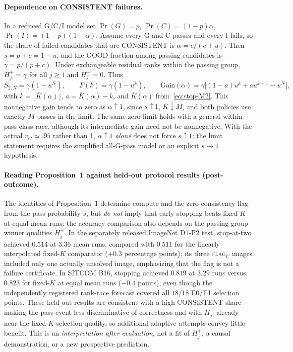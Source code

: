 \paragraph{Dependence on CONSISTENT failures.}
In a reduced G/C/I model set
$\Pr(G)=p$, $\Pr(C)=(1-p)\alpha$,
$\Pr(I)=(1-p)(1-\alpha)$. Assume every G and C passes and every I
fails, so the share of failed candidates that are CONSISTENT is
$\alpha=c/(c+u)$. Then
$s=p+c=1-u$, and the GOOD fraction among passing candidates is
$\gamma=p/(p+c)$. Under exchangeable residual ranks within the
passing group, $H_j^+=\gamma$ for all $j\ge1$ and $H_j^-=0$.
Thus
\begin{equation}\label{eq:protocol-consistent-share}
 S_{2,N}=\gamma(1-u^N),\qquad
 F(k)=\gamma(1-u^k),\qquad
 \mathrm{Gain}(\alpha)=\gamma\bigl[(1-a)u^k+a u^{k+1}-u^N\bigr],
\end{equation}
with $k=\lfloor\bar K(\alpha)\rfloor$, $a=\bar K(\alpha)-k$,
and $\bar K(\alpha)$ from~\eqref{eq:stop-M2}.
This nonnegative gain tends to zero as $\alpha\uparrow1$, since
$s\uparrow1$, $\bar K\downarrow M$, and both policies use exactly
$M$ passes in the limit. The same zero-limit holds with a general
within-pass class race, although its intermediate gain need not be
nonnegative. With the actual $v_G\simeq.95$ rather than 1,
$\alpha\uparrow1$ \emph{alone} does not force $s\uparrow1$;
the limit statement requires the simplified all-G-pass model or an
explicit $s\to1$ hypothesis.

\paragraph{Reading Proposition~1 against held-out protocol results (post-outcome).}
The identities of Proposition~1 determine compute and the
zero-consistency flag from the pass probability $s$, but \emph{do
not} imply that early stopping beats fixed-$K$ at equal mean runs:
the accuracy comparison also depends on the passing-group winner
qualities $H_j^+$. In the separately released ImageNet D1-P2 test,
stop-at-two achieved $0.514$ at $3.36$ mean runs, compared with
$0.511$ for the linearly interpolated fixed-$K$ comparator
(+$0.3$ percentage points); its three \textsc{flag}$_C$ images
included only one actually unsolved image, emphasizing that the
flag is not a failure certificate. In SITCOM B16, stopping achieved
$0.819$ at $3.29$ runs versus $0.823$ for fixed-$K$ at equal mean
runs ($-0.4$ points), even though the independently registered
rank-race forecast covered all $18/18$ E0/E1 selection points.
These held-out results are consistent with a high CONSISTENT
share making the pass event less discriminative of correctness
and with $H_j^+$ already near the fixed-$K$ selection quality,
so additional adaptive attempts convey little benefit. This
is an \emph{interpretation after evaluation}, not a fit of
$H_j^+$, a causal demonstration, or a new prospective prediction.

